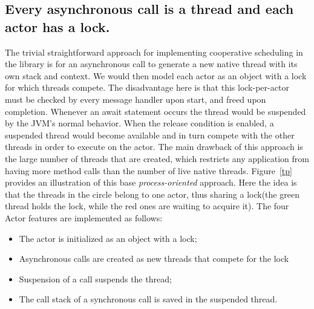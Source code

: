 
\subsection{Every asynchronous call is a thread and each actor has a lock.}
The trivial straightforward approach for implementing cooperative scheduling in the library is for an asynchronous call to generate a new native thread with its own stack and context. We would then model each actor as an object with a lock for which threads compete. The disadvantage here is that this lock-per-actor must be checked by every message handler upon start, and freed upon completion. Whenever an await statement occurs the thread would be suspended by the JVM's normal behavior. When the release condition is enabled, a suspended thread would become available and in turn compete with the other threads in order to execute on the actor. The main drawback of this approach is the large number of threads that are created, which restricts any application from having more method calls than the number of live native threads. Figure~\ref{tp} provides an illustration of this base \textit{process-oriented} approach. Here the idea is that the threads in the circle belong to one actor, thus sharing a lock(the green thread holds the lock, while the red ones are waiting to acquire it). The four Actor features are implemented as follows:

\begin{itemize}
	\item The actor is initialized as an object with a lock;
	\item Asynchronous calls are created as new threads that compete for the lock
	\item Suspension of a call  suspends the thread;
	\item The call stack of a synchronous call is saved in the suspended thread.
\end{itemize}


